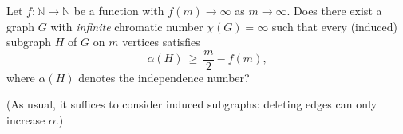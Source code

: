 Let $f:\mathbb{N}\to\mathbb{N}$ be a function with $f(m)\to\infty$ as $m\to\infty$.
Does there exist a graph $G$ with \emph{infinite} chromatic number $\chi(G)=\infty$ such that
every (induced) subgraph $H$ of $G$ on $m$ vertices satisfies
\[
\alpha(H)\ \ge\ \frac{m}{2} - f(m),
\]
where $\alpha(H)$ denotes the independence number?

(As usual, it suffices to consider induced subgraphs: deleting edges can only increase $\alpha$.)

